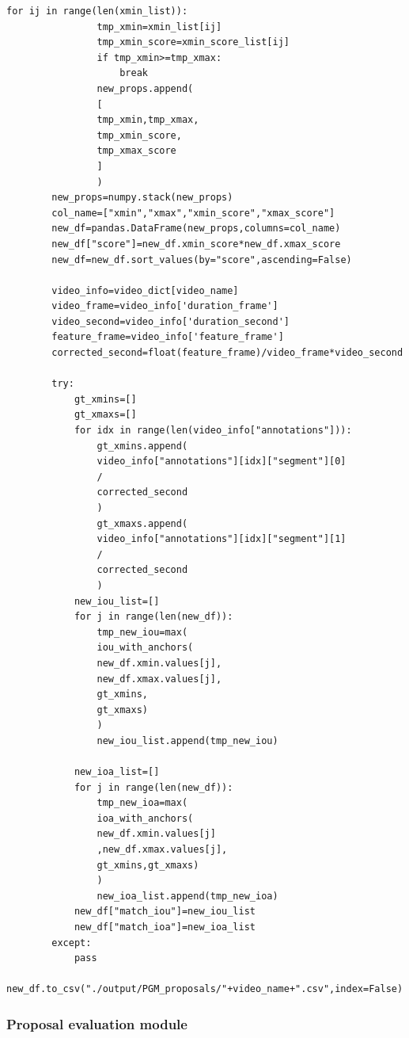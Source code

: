 \begin{lstlisting}[style=python]
            for ij in range(len(xmin_list)):
                tmp_xmin=xmin_list[ij]
                tmp_xmin_score=xmin_score_list[ij]
                if tmp_xmin>=tmp_xmax:
                    break
                new_props.append(
                [
                tmp_xmin,tmp_xmax,
                tmp_xmin_score,
                tmp_xmax_score
                ]
                )
        new_props=numpy.stack(new_props)
        col_name=["xmin","xmax","xmin_score","xmax_score"]
        new_df=pandas.DataFrame(new_props,columns=col_name)  
        new_df["score"]=new_df.xmin_score*new_df.xmax_score
        new_df=new_df.sort_values(by="score",ascending=False)
        
        video_info=video_dict[video_name]
        video_frame=video_info['duration_frame']
        video_second=video_info['duration_second']
        feature_frame=video_info['feature_frame']
        corrected_second=float(feature_frame)/video_frame*video_second
        
        try:
            gt_xmins=[]
            gt_xmaxs=[]
            for idx in range(len(video_info["annotations"])):
                gt_xmins.append(
                video_info["annotations"][idx]["segment"][0]
                /
                corrected_second
                )
                gt_xmaxs.append(
                video_info["annotations"][idx]["segment"][1]
                /
                corrected_second
                )
            new_iou_list=[]
            for j in range(len(new_df)):
                tmp_new_iou=max(
                iou_with_anchors(
                new_df.xmin.values[j],
                new_df.xmax.values[j],
                gt_xmins,
                gt_xmaxs)
                )
                new_iou_list.append(tmp_new_iou)
                
            new_ioa_list=[]
            for j in range(len(new_df)):
                tmp_new_ioa=max(
                ioa_with_anchors(
                new_df.xmin.values[j]
                ,new_df.xmax.values[j],
                gt_xmins,gt_xmaxs)
                )
                new_ioa_list.append(tmp_new_ioa)
            new_df["match_iou"]=new_iou_list
            new_df["match_ioa"]=new_ioa_list
        except:
            pass
        new_df.to_csv("./output/PGM_proposals/"+video_name+".csv",index=False)
    \end{lstlisting}
\subsubsection{Proposal evaluation module}
    

